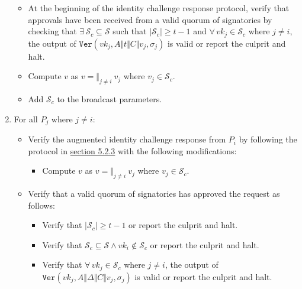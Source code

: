 \documentclass[
]{article}
\providecommand{\tightlist}{%
  \setlength{\itemsep}{0pt}\setlength{\parskip}{0pt}}
\begin{document}
\begin{enumerate}
  \begin{itemize}
  \tightlist
  \item
    At the beginning of the identity challenge response protocol, verify
    that approvals have been received from a valid quorum of signatories
    by checking that \(\exists \, \mathcal{S} _c \subseteq \mathcal{S}\)
    such that \(|\mathcal{S} _c| \geq t - 1\) and
    \(\forall \, vk_j \in \mathcal{S} _c\) where \(j \neq i\), the
    output of
    \(\mathtt{Ver}(vk_j, A \Vert t \Vert C \Vert v_j, \sigma _j)\) is
    valid or report the culprit and halt.
  \item
    Compute \(v\) as \(v = \Vert _{j \neq i} \: v_j\) where
    \(v_j \in \mathcal{S} _c\).
  \item
    Add \(\mathcal{S} _c\) to the broadcast parameters.
  \end{itemize}
\item
  For all \(P_j\) where \(j \neq i\):

  \begin{itemize}
  \tightlist
  \item
    Verify the augmented identity challenge response from \(P_i\) by
    following the protocol in
    \protect\hyperlink{identity-challenge-verification}{section 5.2.3}
    with the following modifications:

    \begin{itemize}
    \tightlist
    \item
      Compute \(v\) as \(v = \Vert _{j \neq i} \: v_j\) where
      \(v_j \in \mathcal{S} _c\).
    \end{itemize}
  \item
    Verify that a valid quorum of signatories has approved the request
    as follows:

    \begin{itemize}
    \tightlist
    \item
      Verify that \(|\mathcal{S} _c| \geq t - 1\) or report the culprit
      and halt.
    \item
      Verify that
      \(\mathcal{S} _c \subseteq \mathcal{S} \land vk_i \notin \mathcal{S} _c\)
      or report the culprit and halt.
    \item
      Verify that \(\forall \, vk_j \in \mathcal{S} _c\) where
      \(j \neq i\), the output of
      \(\mathtt{Ver}(vk_j, A \Vert \Delta \Vert C \Vert v_j, \sigma _j)\)
      is valid or report the culprit and halt.
    \end{itemize}
  \end{itemize}
\end{enumerate}
\end{document}
